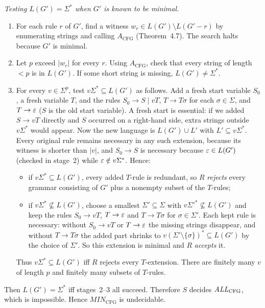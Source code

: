\begin{soln}
\emph{Testing $L(G')=\Sigma^*$ when $G'$ is known to be minimal.}
\begin{enumerate}
\item For each rule $r$ of $G'$, find a witness $w_r\in L(G')\setminus L(G'-r)$ by enumerating strings and calling $A_{\mathrm{CFG}}$ (Theorem~4.7). The search halts because $G'$ is minimal.
\item Let $p$ exceed $|w_r|$ for every $r$. Using $A_{\mathrm{CFG}}$, check that every string of length $<p$ is in $L(G')$. If some short string is missing, $L(G')\neq\Sigma^*$.
\item For every $v\in\Sigma^p$, test $v\Sigma^*\subseteq L(G')$ as follows. Add a fresh start variable $S_0$, a fresh variable $T$, and the rules $S_0\to S\mid vT$, $T\to T\sigma$ for each $\sigma\in\Sigma$, and $T\to\varepsilon$ ($S$ is the old start variable). A fresh start is essential: if we added $S\to vT$ directly and $S$ occurred on a right-hand side, extra strings outside $v\Sigma^*$ would appear. Now the new language is $L(G')\cup L'$ with $L'\subseteq v\Sigma^*$. Every original rule remains necessary in any such extension, because its witness is shorter than $|v|$, and $S_0\to S$ is necessary because $\varepsilon\in L(G')$ (checked in stage~2) while $\varepsilon\notin v\Sigma^*$. Hence:
\begin{itemize}
\item if $v\Sigma^*\subseteq L(G')$, every added $T$-rule is redundant, so $R$ \emph{rejects} every grammar consisting of $G'$ plus a nonempty subset of the $T$-rules;
\item if $v\Sigma^*\not\subseteq L(G')$, choose a smallest $\Sigma'\subseteq\Sigma$ with $v\Sigma'^*\not\subseteq L(G')$ and keep the rules $S_0\to vT$, $T\to\varepsilon$ and $T\to T\sigma$ for $\sigma\in\Sigma'$. Each kept rule is necessary: without $S_0\to vT$ or $T\to\varepsilon$ the missing strings disappear, and without $T\to T\sigma$ the added part shrinks to $v(\Sigma'\setminus\{\sigma\})^*\subseteq L(G')$ by the choice of $\Sigma'$. So this extension is minimal and $R$ \emph{accepts} it.
\end{itemize}
Thus $v\Sigma^*\subseteq L(G')$ iff $R$ rejects every $T$-extension. There are finitely many $v$ of length $p$ and finitely many subsets of $T$-rules.
\end{enumerate}
Then $L(G')=\Sigma^*$ iff stages~2--3 all succeed. Therefore $S$ decides $\mathit{ALL}_{\mathrm{CFG}}$, which is impossible. Hence $\mathit{MIN}_{\mathrm{CFG}}$ is undecidable.
\end{soln}
